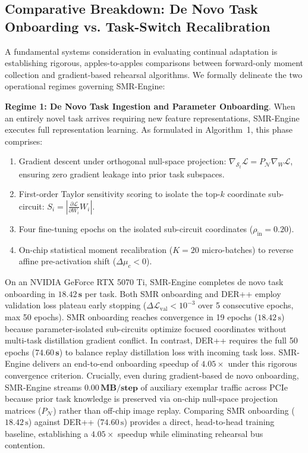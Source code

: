 \documentclass{article}
\begin{document}
\subsection{Comparative Breakdown: De Novo Task Onboarding vs. Task-Switch Recalibration}
\label{sec:app_onboarding_vs_recal}
A fundamental systems consideration in evaluating continual adaptation is establishing rigorous, apples-to-apples comparisons between forward-only moment collection and gradient-based rehearsal algorithms. We formally delineate the two operational regimes governing SMR-Engine:

\noindent\textbf{Regime 1: De Novo Task Ingestion and Parameter Onboarding}. When an entirely novel task arrives requiring new feature representations, SMR-Engine executes full representation learning. As formulated in Algorithm~1, this phase comprises:
\begin{enumerate}\small\setlength{\itemsep}{0pt}\setlength{\parskip}{0pt}
    \item Gradient descent under orthogonal null-space projection: $\nabla_{\mathcal{S}_t} \mathcal{L} = P_{\mathcal{N}} \nabla_W \mathcal{L}$, ensuring zero gradient leakage into prior task subspaces.
    \item First-order Taylor sensitivity scoring to isolate the top-$k$ coordinate sub-circuit: $S_i = |\frac{\partial \mathcal{L}}{\partial W_i} W_i|$.
    \item Four fine-tuning epochs on the isolated sub-circuit coordinates ($\rho_{\mathrm{in}} = 0.20$).
    \item On-chip statistical moment recalibration ($K=20$ micro-batches) to reverse affine pre-activation shift ($\Delta\mu_c < 0$).
\end{enumerate}
On an NVIDIA GeForce RTX 5070 Ti, SMR-Engine completes de novo task onboarding in $\mathbf{18.42\,\text{s}}$ per task. Both SMR onboarding and DER++ employ validation loss plateau early stopping ($\Delta\mathcal{L}_{\mathrm{val}} < 10^{-3}$ over 5 consecutive epochs, max 50 epochs). SMR onboarding reaches convergence in 19 epochs ($18.42\,\text{s}$) because parameter-isolated sub-circuits optimize focused coordinates without multi-task distillation gradient conflict. In contrast, DER++ requires the full 50 epochs ($\mathbf{74.60\,\text{s}}$) to balance replay distillation loss with incoming task loss. SMR-Engine delivers an end-to-end onboarding speedup of $\mathbf{4.05\times}$ under this rigorous convergence criterion. Crucially, even during gradient-based de novo onboarding, SMR-Engine streams $\mathbf{0.00\,\text{MB/step}}$ of auxiliary exemplar traffic across PCIe because prior task knowledge is preserved via on-chip null-space projection matrices ($P_{\mathcal{N}}$) rather than off-chip image replay. Comparing SMR onboarding ($18.42\,\text{s}$) against DER++ ($74.60\,\text{s}$) provides a direct, head-to-head training baseline, establishing a $4.05\times$ speedup while eliminating rehearsal bus contention.
\end{document}
